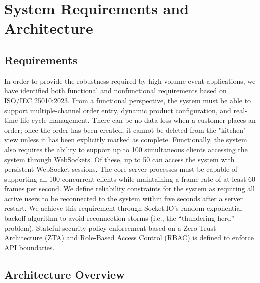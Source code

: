 \documentclass[conference]{IEEEtran}
\begin{document}
\section{System Requirements and Architecture}

\subsection{Requirements}

In order to provide the robustness required by high-volume event applications, we have identified both functional and nonfunctional requirements based on ISO/IEC 25010:2023. From a functional perspective, the system must be able to support multiple-channel order entry, dynamic product configuration, and real-time life cycle management. There can be no data loss when a customer places an order; once the order has been created, it cannot be deleted from the "kitchen" view unless it has been explicitly marked as complete. Functionally, the system also requires the ability to support up to 100 simultaneous clients accessing the system through WebSockets. Of these, up to 50 can access the system with persistent WebSocket sessions. The core server processes must be capable of supporting all 100 concurrent clients while maintaining a frame rate of at least 60 frames per second. We define reliability constraints for the system as requiring all active users to be reconnected to the system within five seconds after a server restart. We achieve this requirement through Socket.IO's random exponential backoff algorithm to avoid reconnection storms (i.e., the ``thundering herd'' problem). Stateful security policy enforcement based on a Zero Trust Architecture (ZTA) and Role-Based Access Control (RBAC) is defined to enforce API boundaries.

\subsection{Architecture Overview}
\end{document}

